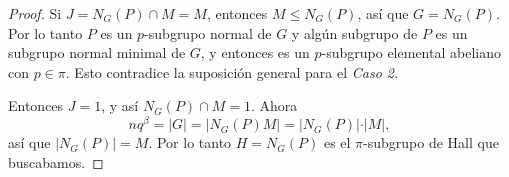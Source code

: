 \begin{proof}
		Si $J = N_G(P)\cap M = M$, entonces $M\leq N_G(P)$, as\'i que $G=N_G(P)$. Por lo tanto $P$ es un $p$-subgrupo normal de $G$ y alg\'un subgrupo de $P$ es un subgrupo normal minimal de $G$, y entonces es un $p$-subgrupo elemental abeliano con $p\in \pi$. Esto contradice la suposici\'on general para el \textit{Caso 2.}
		
		Entonces $J = 1$, y as\'i $N_G(P)\cap M = 1$. Ahora
		\[nq^{\beta} = \vert G\vert = \vert N_G(P)M\vert = \vert N_G(P)\vert\cdot \vert M\vert,\]
		as\'i que $\vert N_G(P)\vert = M$. Por lo tanto $H = N_G(P)$ es el $\pi$-subgrupo de Hall que buscabamos.
\end{proof}
